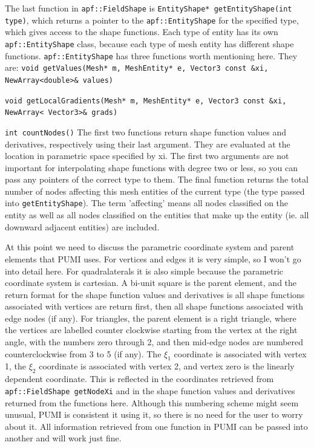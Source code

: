 \documentclass[12pt]{article}
\newcommand{\ttt}{\texttt}
\begin{document}
The last function in \ttt{apf::FieldShape} is 
\newline
\newline
\noindent\ttt{EntityShape* getEntityShape(int type)},
\newline
\newline
which returns a pointer to the \ttt{apf::EntityShape} for the specified type, which gives access to the shape functions.  Each type of entity has its own \ttt{apf::EntityShape} class, because each type of mesh entity has different shape functions.  \ttt{apf::EntityShape} has three functions worth mentioning here.  They are:
\newline
\newline
\noindent\ttt{void getValues(Mesh* m, MeshEntity* e, Vector3 const \&xi, NewArray<double>\& values)}

\noindent\ttt{void getLocalGradients(Mesh* m, MeshEntity* e, Vector3 const \&xi, NewArray< Vector3>\& grads)}

\noindent\ttt{int countNodes()}
\newline
\newline
The first two functions return shape function values and derivatives, respectively using their last argument.  They are evaluated at the location in parametric space specified by xi.  
The first two arguments are not important for interpolating shape functions with degree two or less, so you can pass any pointers of the correct type to them.
The final function returns the total number of nodes affecting this mesh entities of the current type (the type passed into \ttt{getEntityShape}).  
The term 'affecting' means all nodes classified on the entity as well as all nodes classified on the entities that make up the entity (ie. all downward adjacent entities) are included.

At this point we need to discuss the parametric coordinate system and parent elements that PUMI uses.
For vertices and edges it is very simple, so I won't go into detail here.
For quadralaterals it is also simple because the parametric coordinate system is cartesian.  A bi-unit square is the parent element, and the return format for the shape function values and derivatives is all shape functions associated with vertices are return first, then all shape functions associated with edge nodes (if any).
For triangles, the parent element is a right triangle, where the vertices are labelled counter clockwise starting from the vertex at the right angle, with the numbers zero through 2, and then mid-edge nodes are numbered counterclockwise from 3 to 5 (if any).  
The $\xi_1$ coordinate is associated with vertex 1, the $\xi_2$ coordinate is associated with vertex 2, and vertex zero is the linearly dependent coordinate.  
This is reflected in the coordinates retrieved from \ttt{apf::FieldShape getNodeXi} and in the shape function values and derivatives returned from the functions here.  
Although this numbering scheme might seem unusual, PUMI is consistent it using it, so there is no need for the user to worry about it.  
All information retrieved from one function in PUMI can be passed into another and will work just fine.
\end{document}
